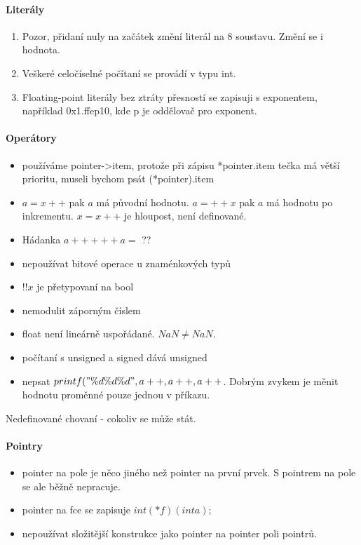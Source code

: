 \paragraph{Literály}
\begin{enumerate}
	\item Pozor, přidaní nuly na začátek změní literál na 8 soustavu.
		Změní se i hodnota.
	\item Veškeré celočíselné počítaní se provádí v typu int.
	\item Floating-point literály bez ztráty přesností se zapisuji s exponentem, například 0x1.ffep10, kde p je oddělovač pro exponent.
\end{enumerate}

\paragraph{Operátory}
\begin{itemize}
	\item používáme pointer->item, protože při zápisu *pointer.item tečka má větší prioritu, museli bychom psát (*pointer).item
	\item $a = x++$ pak $a$ má původní hodnotu. $a = ++x$ pak $a$ má hodnotu po inkrementu.
		$x = x++$ je hloupost, není definované.
	\item Hádanka $a+++++a = $ ??
	\item nepoužívat bitové operace u znaménkových typů
	\item $!!x$ je přetypovaní na bool
	\item nemodulit záporným číslem
	\item float není lineárně uspořádané. $NaN \ne NaN$.
	\item počítaní s unsigned a signed dává unsigned
	\item nepsat $printf("\%d \%d \%d", a++, a++, a++$.
		Dobrým zvykem je měnit hodnotu proměnné pouze jednou v příkazu.
\end{itemize}

Nedefinované chovaní - cokoliv se může stát.

\paragraph{Pointry}
\begin{itemize}
	\item pointer na pole je něco jiného než pointer na první prvek. S pointrem na pole se ale běžně nepracuje.
	\item pointer na fce se zapisuje $int (*f)(int a);$
	\item nepoužívat složitější konstrukce jako pointer na pointer poli pointrů.
\end{itemize}

